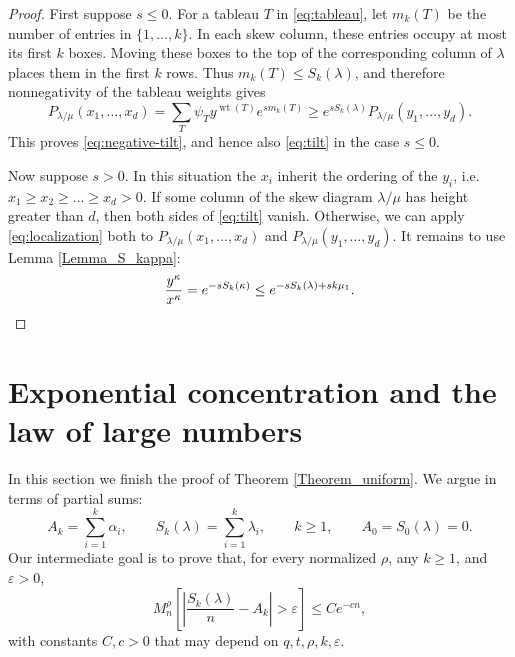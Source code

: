 \documentclass[11pt,reqno]{amsart}
\theoremstyle{definition}
\theoremstyle{remark}
\numberwithin{equation}{section}
\newcommand{\wt}{\operatorname{wt}}
\begin{document}
\begin{proof}
First suppose $s\le0$. For a tableau $T$ in \eqref{eq:tableau}, let
$m_k(T)$ be the number of entries in $\{1,\ldots,k\}$.
In each skew column, these entries occupy at most its first $k$ boxes.
Moving these boxes to the top of the corresponding column of $\lambda$
places them in the first $k$ rows. Thus $m_k(T)\le S_k(\lambda)$, and therefore
nonnegativity of the tableau weights gives
\[
 P_{\lambda/\mu}(x_1,\dots,x_d)
 =\sum_T\psi_T y^{\wt(T)}e^{s m_k(T)}
 \ge e^{sS_k(\lambda)}P_{\lambda/\mu}(y_1,\dots,y_d).
\]
This proves \eqref{eq:negative-tilt}, and hence also \eqref{eq:tilt} in the case $s\le 0$. 

Now suppose $s>0$. In this situation the $x_i$ inherit the ordering of the $y_i$, i.e.\ $x_1\ge x_2\ge\dots\ge x_d>0$.  If some column of the skew diagram $\lambda/\mu$ has height greater than $d$, then
both sides of \eqref{eq:tilt} vanish. Otherwise, we can apply \eqref{eq:localization} both to $P_{\lambda/\mu}(x_1,\dots,x_d)$ and $P_{\lambda/\mu}(y_1,\dots,y_d)$.
It remains to use Lemma \ref{Lemma_S_kappa}:
\[
 \frac{y^\kappa}{x^\kappa}
 =e^{-sS_k(\kappa)}
 \le e^{-sS_k(\lambda)+sk\mu_1}. \qedhere
\]
\end{proof}

\section{Exponential concentration and the law of large numbers}
\label{Section_concentration}

In this section we finish the proof of Theorem \ref{Theorem_uniform}. We argue in terms of partial sums:
\[
 A_k=\sum_{i=1}^k\alpha_i, \qquad  S_k(\lambda)=\sum_{i=1}^k\lambda_i, \qquad k\ge 1,\qquad   A_0=S_0(\lambda)=0.
\]
Our intermediate goal is to prove that, for every normalized $\rho$, any $k\ge1$, and
$\varepsilon>0$,
\begin{equation}\label{eq:row-concentration}
 M_n^\rho\left[\left|\frac{S_k(\lambda)}n-A_k\right|>\varepsilon\right]
 \le Ce^{-cn},
\end{equation}
with constants $C,c>0$ that may depend on $q,t,\rho,k,\varepsilon$.
\end{document}
